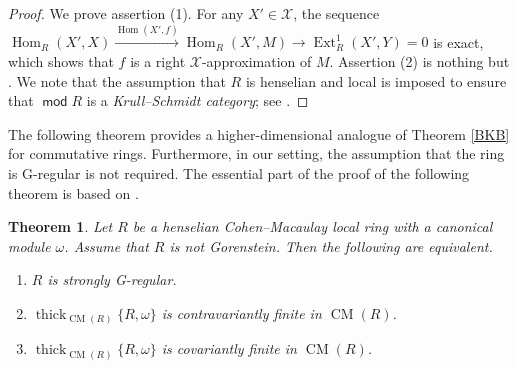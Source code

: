 \documentclass{amsart}
\newtheorem{thm}{Theorem}[section]
\theoremstyle{definition}
\theoremstyle{remark}
\numberwithin{equation}{thm}
\def\cm{\operatorname{CM}}
\def\Ext{\operatorname{Ext}}
\def\Hom{\operatorname{Hom}}
\def\mod{\operatorname{\mathsf{mod}}}
\def\thick{\operatorname{thick}}
\def\X{\mathcal{X}}
\begin{document}
\begin{proof}
We prove assertion (1). For any $X'\in\X$, the sequence $\Hom_R(X',X)\xrightarrow{\Hom(X',f)}\Hom_R(X',M)\to\Ext_R^1(X',Y)=0$ is exact, which shows that $f$ is a right $\X$-approximation of $M$.
Assertion (2) is nothing but \cite[Lemma 3.8]{T11}.
We note that the assumption that $R$ is henselian and local is imposed to ensure that $\mod R$ is a \textit{Krull--Schmidt category}; see \cite[Section 1]{LW}.
\end{proof}

The following theorem provides a higher-dimensional analogue of Theorem \ref{BKB} for commutative rings.
Furthermore, in our setting, the assumption that the ring is G-regular is not required.
The essential part of the proof of the following theorem is based on \cite[Theorem 1.4]{T11}.

\begin{thm}\label{contfin}
Let $R$ be a henselian Cohen--Macaulay local ring with a canonical module $\omega$. Assume that $R$ is not Gorenstein. Then the following are equivalent.
\begin{enumerate}[\rm(1)]
   \item $R$ is strongly G-regular.
   \item $\thick_{\cm(R)}\{R,\omega\}$ is contravariantly finite in $\cm(R)$.
   \item $\thick_{\cm(R)}\{R,\omega\}$ is covariantly finite in $\cm(R)$.
\end{enumerate}
\end{thm}
\end{document}
